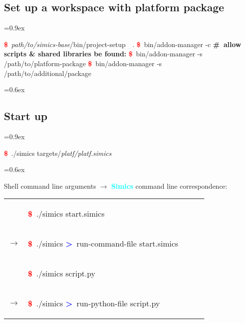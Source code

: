 \documentclass[8pt]{extarticle}
\newenvironment{code}[1][]{%
\begin{prebox}[#1]\obeylines%
\fontdimen2\font=0.9ex%
}{%
\end{prebox}%
\fontdimen2\font=0.6ex%
}
\newenvironment{codem}[1][\linewidth]{%
\begin{minipage}{#1}%
\begin{prebox}\obeylines}{%
\end{prebox}%
\end{minipage}}
\newenvironment{code9}{\begin{codem}[0.9\linewidth]}{\end{codem}}
\newcommand{\prompt}{\textcolor{red}{\textbf{\$}\ }}
\newcommand{\sprompt}{\textcolor{blue}{\textbf{>}\ }}
\newcommand{\cmtcommon}[1]{\textcolor{Sepia}{\textbf{#1}}}
\newcommand{\cmt}[1]{\cmtcommon{\#\ #1}}
\newcommand{\p}[1]{\textit{\large#1}}
\newcommand{\Simics}{\textcolor{cyan}{\textbf{Simics}}}
\begin{document}
\begin{multicols*}{3}
\subsection{Set up a workspace with platform package}
    \begin{code}
        \prompt \p{path/to/simics-base}/bin/project-setup\ \ .
        \prompt bin/addon-manager -c
        \cmt{allow scripts \& shared libraries be found:}
        \prompt bin/addon-manager -s /path/to/platform-package
        \prompt bin/addon-manager -s /path/to/additional/package
    \end{code}

\subsection{Start up}
    \begin{code}
        \prompt ./simics targets/\p{platf/platf.simics}
    \end{code}

    
    Shell command line arguments $\longrightarrow$ \Simics{} command line 
        correspondence:

    \begin{tabular}{lp{0.9\linewidth}}
        &
        \begin{code9}
            \prompt ./simics start.simics
        \end{code9}
        \vspace{0.05cm}
        \\
        $\longrightarrow$ &
        \begin{code9}
            \prompt ./simics
            \sprompt run-command-file start.simics
        \end{code9}
        \vspace{0.2cm}
        \\

        & \begin{code9}
            \prompt ./simics script.py
        \end{code9}
        \vspace{0.05cm}
        \\
        $\longrightarrow$ &
        \begin{code9}
            \prompt ./simics
            \sprompt run-python-file script.py
        \end{code9}
        \vspace{0.2cm}
        \\


\end{tabular}
\end{multicols*}
\end{document}
